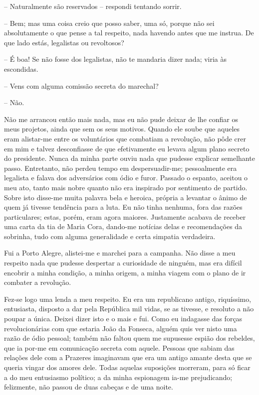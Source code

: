 -- Naturalmente são reservados -- respondi tentando sorrir.

-- Bem; mas uma coisa creio que posso saber, uma só, porque não sei
absolutamente o que pense a tal respeito, nada havendo antes que me
instrua. De que lado estás, legalistas ou revoltosos?

-- É boa! Se não fosse dos legalistas, não te mandaria dizer nada; viria
às escondidas.

-- Vens com alguma comissão secreta do marechal?

-- Não.

Não me arrancou então mais nada, mas eu não pude deixar de lhe confiar
os meus projetos, ainda que sem os seus motivos. Quando ele soube que
aqueles eram alistar-me entre os voluntários que combatiam a revolução,
não pôde crer em mim e talvez desconfiasse de que efetivamente eu levava
algum plano secreto do presidente. Nunca da minha parte ouviu nada que
pudesse explicar semelhante passo. Entretanto, não perdeu tempo em
despersuadir-me; pessoalmente era legalista e falava dos adversários com
ódio e furor. Passado o espanto, aceitou o meu ato, tanto mais nobre
quanto não era inspirado por sentimento de partido. Sobre isto disse-me
muita palavra bela e heroica, própria a levantar o ânimo de quem já
tivesse tendência para a luta. Eu não tinha nenhuma, fora das razões
particulares; estas, porém, eram agora maiores. Justamente acabava de
receber uma carta da tia de Maria Cora, dando-me notícias delas e
recomendações da sobrinha, tudo com alguma generalidade e certa simpatia
verdadeira.

Fui a Porto Alegre, alistei-me e marchei para a campanha. Não disse a
meu respeito nada que pudesse despertar a curiosidade de ninguém, mas
era difícil encobrir a minha condição, a minha origem, a minha viagem
com o plano de ir combater a revolução.

Fez-se logo uma lenda a meu respeito. Eu era um republicano antigo,
riquíssimo, entusiasta, disposto a dar pela República mil vidas, se as
tivesse, e resoluto a não poupar a única. Deixei dizer isto e o mais e
fui. Como eu indagasse das forças revolucionárias com que estaria João
da Fonseca, alguém quis ver nisto uma razão de ódio pessoal; também não
faltou quem me supusesse espião dos rebeldes, que ia por-me em
comunicação secreta com aquele. Pessoas que sabiam das relações dele com
a Prazeres imaginavam que era um antigo amante desta que se queria
vingar dos amores dele. Todas aquelas suposições morreram, para só ficar
a do meu entusiasmo político; a da minha espionagem ia-me prejudicando;
felizmente, não passou de duas cabeças e de uma noite.


